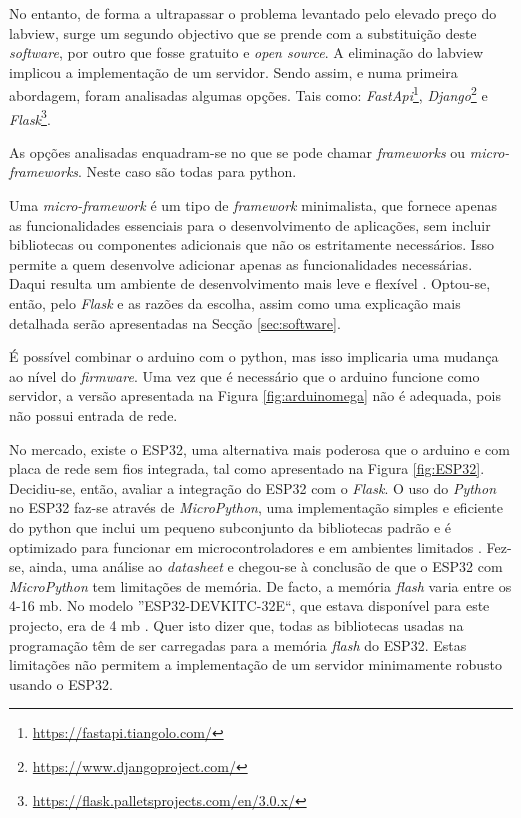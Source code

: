 No entanto, de forma a ultrapassar o problema levantado pelo elevado preço do \acrshort{labview}, surge um segundo objectivo que se prende com a substituição deste \textit{software}, por outro que fosse gratuito e \textit{open source}. A eliminação do \acrshort{labview} implicou a implementação de um servidor. Sendo assim, e numa primeira abordagem, foram analisadas algumas opções. Tais como: \textit{FastApi}\footnote{\url{https://fastapi.tiangolo.com/}}, \textit{Django}\footnote{\url{https://www.djangoproject.com/}} e \textit{Flask}\footnote{\url{https://flask.palletsprojects.com/en/3.0.x/}}.

As opções analisadas enquadram-se no que se pode chamar \textit{frameworks} ou \textit{micro-frameworks}. Neste caso são todas para \gls{python}.

Uma \textit{micro-framework} é um tipo de \textit{framework} minimalista, que fornece apenas as funcionalidades essenciais para o desenvolvimento de aplicações, sem incluir bibliotecas ou componentes adicionais que não os estritamente necessários. Isso permite a quem desenvolve adicionar apenas as funcionalidades necessárias. Daqui resulta um ambiente de desenvolvimento mais leve e flexível \cite{Flask}.
Optou-se, então, pelo \textit{Flask} e as razões da escolha, assim como uma explicação mais detalhada serão apresentadas na Secção \ref{sec:software}.

É possível combinar o \gls{arduino} com o \gls{python}, mas isso implicaria uma mudança ao nível do \textit{firmware}. Uma vez que é necessário que o \gls{arduino} funcione como servidor, a versão apresentada na Figura \ref{fig:arduinomega} não é adequada, pois não possui entrada de rede.

No mercado, existe o \gls{ESP32}, uma alternativa mais poderosa que o \gls{arduino} e com placa de rede sem fios integrada, tal como apresentado na Figura \ref{fig:ESP32}. Decidiu-se, então, avaliar a integração do \gls{ESP32} com o \textit{Flask}. O uso do \textit{Python} no \gls{ESP32} faz-se através de \textit{MicroPython}, uma implementação simples e eficiente do \gls{python} que inclui um pequeno subconjunto da bibliotecas padrão e é optimizado para funcionar em microcontroladores e em ambientes limitados \cite{MicroPythondefinition}.
Fez-se, ainda, uma análise ao \textit{datasheet} \cite{esp32datasheet} e chegou-se à conclusão de que o \gls{ESP32} com \textit{MicroPython} tem limitações de memória. De facto, a memória \textit{flash} varia entre os 4-16 \acrlong{mb}. No modelo ''ESP32-DEVKITC-32E``, que estava disponível para este projecto, era de 4 \acrshort{mb} \cite{diferencaspython}. Quer isto dizer que, todas as bibliotecas usadas na programação têm de ser carregadas para a memória \textit{flash} do \gls{ESP32}. Estas limitações não permitem a implementação de um servidor minimamente robusto usando o \gls{ESP32}.

